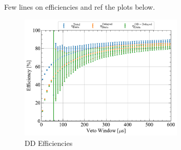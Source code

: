{\color{red}Few lines on efficiencies and ref the plots below.}

\begin{figure}[!ht]
    \centering
    \includegraphics[width=0.7\textwidth]{figures/VetoEfficiency/DDEfficiencies_Data.pdf}
    \caption{DD Efficiencies}
    \label{fig:VetoEff/DDEfficiencies}
\end{figure}

